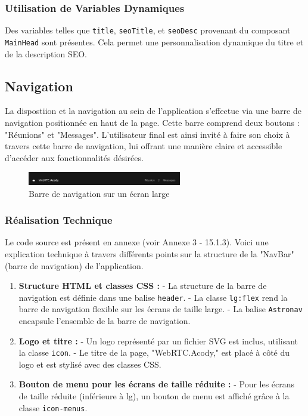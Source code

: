 \documentclass[12pt, a4paper, oneside]{article}
\begin{document}
\subsubsection{Utilisation de Variables Dynamiques}
Des variables telles que \texttt{title}, \texttt{seoTitle}, et \texttt{seoDesc} provenant du composant \texttt{MainHead} sont présentes. Cela permet une personnalisation dynamique du titre et de la description SEO.

\newpage
\subsection{Navigation}
La dispostiion et la navigation au sein de l'application s'effectue via une barre de navigation positionnée en haut de la page. Cette barre comprend deux boutons : "Réunions" et "Messages". L'utilisateur final est ainsi invité à faire son choix à travers cette barre de navigation, lui offrant une manière claire et accessible d'accéder aux fonctionnalités désirées.

\begin{figure}[h]
    \centering
    \includegraphics[width=0.6\textwidth]{images/NavBarPC.png}
    \caption{Barre de navigation sur un écran large}
\end{figure}

\subsubsection{Réalisation Technique}
Le code source est présent en annexe (voir Annexe 3 - 15.1.3). Voici une explication technique à travers différents points sur la structure de la "NavBar" (barre de navigation) de l'application.

\begin{enumerate}
    \item \textbf{Structure HTML et classes CSS :}
    - La structure de la barre de navigation est définie dans une balise \texttt{header}.
    - La classe \texttt{lg:flex} rend la barre de navigation flexible sur les écrans de taille large.
    - La balise \texttt{Astronav} encapsule l'ensemble de la barre de navigation.

    \item \textbf{Logo et titre :}
    - Un logo représenté par un fichier SVG est inclus, utilisant la classe \texttt{icon}.
    - Le titre de la page, "WebRTC.Acody," est placé à côté du logo et est stylisé avec des classes CSS.

    \item \textbf{Bouton de menu pour les écrans de taille réduite :}
    - Pour les écrans de taille réduite (inférieure à lg), un bouton de menu est affiché grâce à la classe \texttt{icon-menus}.

\end{enumerate}
\end{document}
